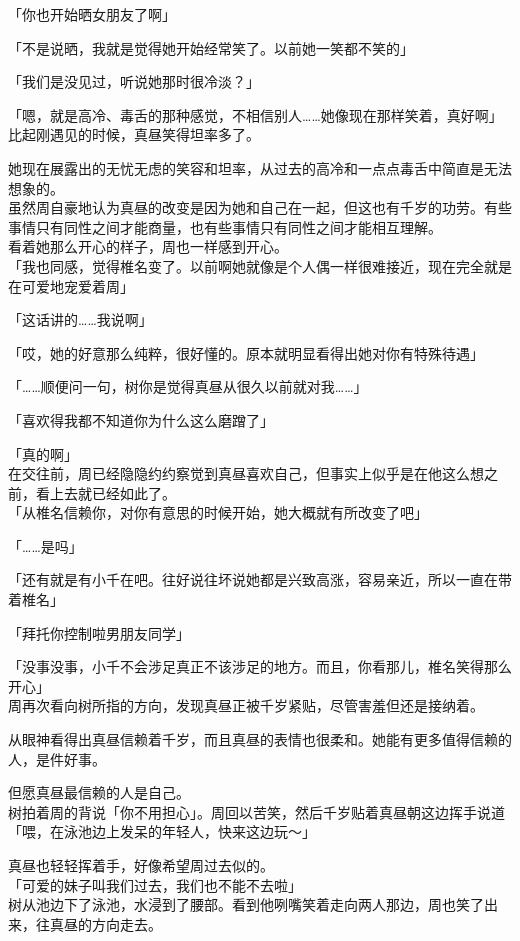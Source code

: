 「你也开始晒女朋友了啊」

「不是说晒，我就是觉得她开始经常笑了。以前她一笑都不笑的」

「我们是没见过，听说她那时很冷淡？」

「嗯，就是高冷、毒舌的那种感觉，不相信别人……她像现在那样笑着，真好啊」\\

比起刚遇见的时候，真昼笑得坦率多了。

她现在展露出的无忧无虑的笑容和坦率，从过去的高冷和一点点毒舌中简直是无法想象的。\\

虽然周自豪地认为真昼的改变是因为她和自己在一起，但这也有千岁的功劳。有些事情只有同性之间才能商量，也有些事情只有同性之间才能相互理解。\\

看着她那么开心的样子，周也一样感到开心。\\

「我也同感，觉得椎名变了。以前啊她就像是个人偶一样很难接近，现在完全就是在可爱地宠爱着周」

「这话讲的……我说啊」

「哎，她的好意那么纯粹，很好懂的。原本就明显看得出她对你有特殊待遇」

「……顺便问一句，树你是觉得真昼从很久以前就对我……」

「喜欢得我都不知道你为什么这么磨蹭了」

「真的啊」\\

在交往前，周已经隐隐约约察觉到真昼喜欢自己，但事实上似乎是在他这么想之前，看上去就已经如此了。\\

「从椎名信赖你，对你有意思的时候开始，她大概就有所改变了吧」

「……是吗」

「还有就是有小千在吧。往好说往坏说她都是兴致高涨，容易亲近，所以一直在带着椎名」

「拜托你控制啦男朋友同学」

「没事没事，小千不会涉足真正不该涉足的地方。而且，你看那儿，椎名笑得那么开心」\\

周再次看向树所指的方向，发现真昼正被千岁紧贴，尽管害羞但还是接纳着。

从眼神看得出真昼信赖着千岁，而且真昼的表情也很柔和。她能有更多值得信赖的人，是件好事。

但愿真昼最信赖的人是自己。\\

树拍着周的背说「你不用担心」。周回以苦笑，然后千岁贴着真昼朝这边挥手说道「喂，在泳池边上发呆的年轻人，快来这边玩～」

真昼也轻轻挥着手，好像希望周过去似的。\\

「可爱的妹子叫我们过去，我们也不能不去啦」\\

树从池边下了泳池，水浸到了腰部。看到他咧嘴笑着走向两人那边，周也笑了出来，往真昼的方向走去。
